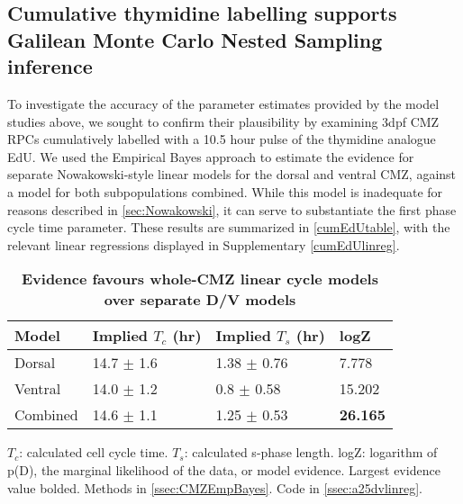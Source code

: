 \FloatBarrier

\subsection{Cumulative thymidine labelling supports Galilean Monte Carlo Nested Sampling inference}
\label{ssec:CMZcumedu}

To investigate the accuracy of the parameter estimates provided by the model studies above, we sought to confirm their plausibility by examining 3dpf CMZ RPCs cumulatively labelled with a 10.5 hour pulse of the thymidine analogue EdU. We used the Empirical Bayes approach to estimate the evidence for separate Nowakowski-style \cite{Nowakowski1989} linear models for the dorsal and ventral CMZ, against a model for both subpopulations combined. While this model is inadequate for reasons described in \autoref{sec:Nowakowski}, it can serve to substantiate the first phase cycle time parameter. These results are summarized in \autoref{cumEdUtable}, with the relevant linear regressions displayed in Supplementary \autoref{cumEdUlinreg}.

\begin{table}[!ht]
    \centering
    \caption{{\bf Evidence favours whole-CMZ linear cycle models over separate D/V models}}
    \begin{tabular}{|l|l|l|l|} 
        \hline {\bf Model} & {\bf Implied $T_c$ (hr)} & {\bf Implied $T_s$ (hr)} & {\bf logZ}\\ \hline 
        Dorsal & 14.7 $\pm$ 1.6 & 1.38 $\pm$ 0.76 & 7.778\\ \hline 
        Ventral & 14.0 $\pm$ 1.2 & 0.8 $\pm$ 0.58 & 15.202\\ \hline
        Combined & 14.6 $\pm$ 1.1 & 1.25 $\pm$ 0.53 & {\bf26.165}\\ \hline
    \end{tabular}
   
    \begin{flushleft} $T_c$: calculated cell cycle time. $T_s$: calculated s-phase length. logZ: logarithm of p(D), the marginal likelihood of the data, or model evidence.  Largest evidence value bolded.
    Methods in \autoref{ssec:CMZEmpBayes}.
    Code in \autoref{ssec:a25dvlinreg}.    

    \end{flushleft}
    \label{cumEdUtable}
\end{table}

